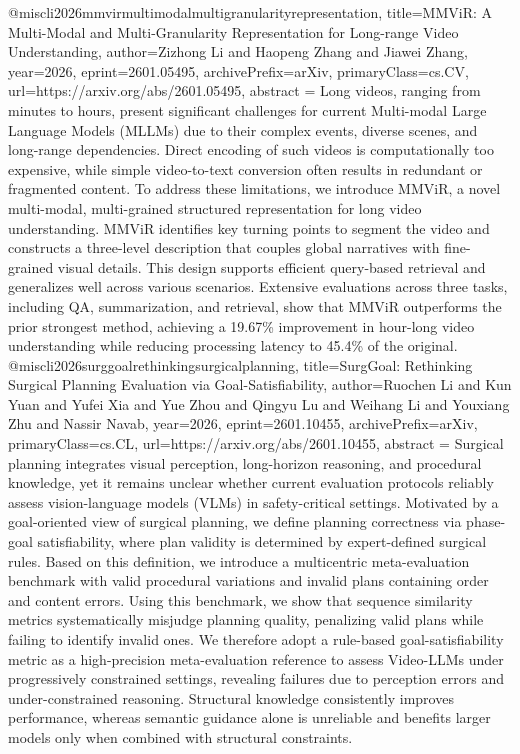 {}@misc{li2026mmvirmultimodalmultigranularityrepresentation,
      title={MMViR: A Multi-Modal and Multi-Granularity Representation for Long-range Video Understanding}, 
      author={Zizhong Li and Haopeng Zhang and Jiawei Zhang},
      year={2026},
      eprint={2601.05495},
      archivePrefix={arXiv},
      primaryClass={cs.CV},
      url={https://arxiv.org/abs/2601.05495},
      abstract = {Long videos, ranging from minutes to hours, present significant challenges for current Multi-modal Large Language Models (MLLMs) due to their complex events, diverse scenes, and long-range dependencies. Direct encoding of such videos is computationally too expensive, while simple video-to-text conversion often results in redundant or fragmented content. To address these limitations, we introduce MMViR, a novel multi-modal, multi-grained structured representation for long video understanding. MMViR identifies key turning points to segment the video and constructs a three-level description that couples global narratives with fine-grained visual details. This design supports efficient query-based retrieval and generalizes well across various scenarios. Extensive evaluations across three tasks, including QA, summarization, and retrieval, show that MMViR outperforms the prior strongest method, achieving a 19.67\% improvement in hour-long video understanding while reducing processing latency to 45.4\% of the original.}
}@misc{li2026surggoalrethinkingsurgicalplanning,
      title={SurgGoal: Rethinking Surgical Planning Evaluation via Goal-Satisfiability}, 
      author={Ruochen Li and Kun Yuan and Yufei Xia and Yue Zhou and Qingyu Lu and Weihang Li and Youxiang Zhu and Nassir Navab},
      year={2026},
      eprint={2601.10455},
      archivePrefix={arXiv},
      primaryClass={cs.CL},
      url={https://arxiv.org/abs/2601.10455},
      abstract = {Surgical planning integrates visual perception, long-horizon reasoning, and procedural knowledge, yet it remains unclear whether current evaluation protocols reliably assess vision-language models (VLMs) in safety-critical settings. Motivated by a goal-oriented view of surgical planning, we define planning correctness via phase-goal satisfiability, where plan validity is determined by expert-defined surgical rules. Based on this definition, we introduce a multicentric meta-evaluation benchmark with valid procedural variations and invalid plans containing order and content errors. Using this benchmark, we show that sequence similarity metrics systematically misjudge planning quality, penalizing valid plans while failing to identify invalid ones. We therefore adopt a rule-based goal-satisfiability metric as a high-precision meta-evaluation reference to assess Video-LLMs under progressively constrained settings, revealing failures due to perception errors and under-constrained reasoning. Structural knowledge consistently improves performance, whereas semantic guidance alone is unreliable and benefits larger models only when combined with structural constraints.}
}
